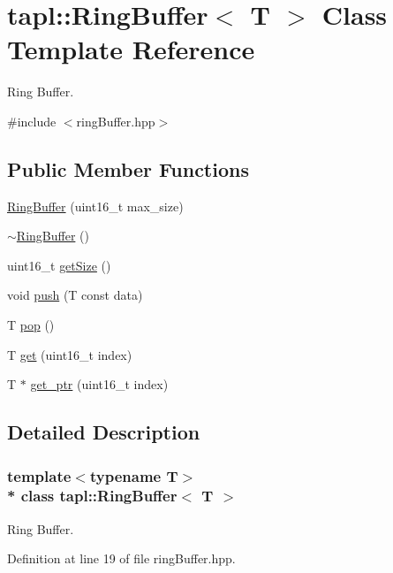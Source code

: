 \hypertarget{classtapl_1_1RingBuffer}{}\section{tapl\+:\+:Ring\+Buffer$<$ T $>$ Class Template Reference}
\label{classtapl_1_1RingBuffer}


Ring Buffer.  




{\ttfamily \#include $<$ring\+Buffer.\+hpp$>$}

\subsection*{Public Member Functions}
\begin{DoxyCompactItemize}
\item 
\hyperlink{classtapl_1_1RingBuffer_ad164e0fc13d245411c356ad687dc504a}{Ring\+Buffer} (uint16\+\_\+t max\+\_\+size)
\item 
\hyperlink{classtapl_1_1RingBuffer_a8e9cc0e12555c499b95a9a6e7943a4d7}{$\sim$\+Ring\+Buffer} ()
\item 
uint16\+\_\+t \hyperlink{classtapl_1_1RingBuffer_a5dfe06176646eeacfb89c464b15815ff}{get\+Size} ()
\item 
void \hyperlink{classtapl_1_1RingBuffer_aa2ab87a6e5b95daf4b9f59e35c24396d}{push} (T const data)
\item 
T \hyperlink{classtapl_1_1RingBuffer_aad957e002e355729e1ef044538ccf110}{pop} ()
\item 
T \hyperlink{classtapl_1_1RingBuffer_a86bd7fbf2c52259184c4e84feaae78d3}{get} (uint16\+\_\+t index)
\item 
T $\ast$ \hyperlink{classtapl_1_1RingBuffer_ae1c8614abf72c558c244c87b8ced7bf7}{get\+\_\+ptr} (uint16\+\_\+t index)
\end{DoxyCompactItemize}


\subsection{Detailed Description}
\subsubsection*{template$<$typename T$>$\\*
class tapl\+::\+Ring\+Buffer$<$ T $>$}

Ring Buffer. 

Definition at line 19 of file ring\+Buffer.\+hpp.



